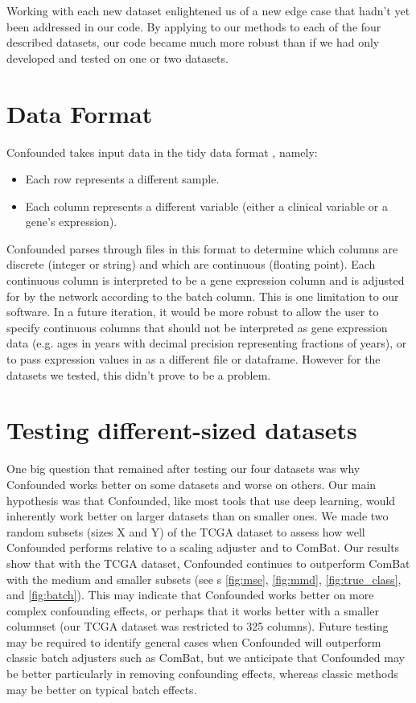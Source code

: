 \documentclass{article}
\begin{document}
Working with each new dataset enlightened us of a new edge case that hadn't yet been addressed in our code.
By applying to our methods to each of the four described datasets, our code became much more robust than if we had only developed and tested on one or two datasets.

\section{Data Format}

Confounded takes input data in the tidy data format \cite{wickham_tidy_2014-1}, namely:

\begin{itemize}
	\item Each row represents a different sample.
	\item Each column represents a different variable (either a clinical variable or a gene's expression).
\end{itemize}

Confounded parses through files in this format to determine which columns are discrete (integer or string) and which are continuous (floating point).
Each continuous column is interpreted to be a gene expression column and is adjusted for by the network according to the batch column.
This is one limitation to our software.
In a future iteration, it would be more robust to allow the user to specify continuous columns that should not be interpreted as gene expression data (e.g. ages in years with decimal precision representing fractions of years), or to pass expression values in as a different file or dataframe.
However for the datasets we tested, this didn't prove to be a problem.

\section{Testing different-sized datasets}

One big question that remained after testing our four datasets was why Confounded works better on some datasets and worse on others.
Our main hypothesis was that Confounded, like most tools that use deep learning, would inherently work better on larger datasets than on smaller ones.
We made two random subsets (sizes X and Y) of the TCGA dataset to assess how well Confounded performs relative to a scaling adjuster and to ComBat. %
Our results show that with the TCGA dataset, Confounded continues to outperform ComBat with the medium and smaller subsets (see \figurename{s} \ref{fig:mse}, \ref{fig:mmd}, \ref{fig:true_class}, and \ref{fig:batch}).
This may indicate that Confounded works better on more complex confounding effects, or perhaps that it works better with a smaller columnset (our TCGA dataset was restricted to 325 columns).
Future testing may be required to identify general cases when Confounded will outperform classic batch adjusters such as ComBat, but we anticipate that Confounded may be better particularly in removing confounding effects, whereas classic methods may be better on typical batch effects.
\end{document}
